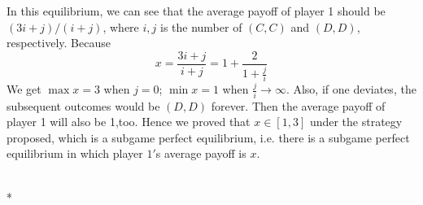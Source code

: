 \documentclass[a4paper,12pt]{article}
\begin{document}
\begin{enumerate}
\begin{enumerate}[a.]
In this equilibrium, we can see that the average payoff of player 1 should be $(3i+j)/(i+j)$,
where $i,j$ is the number of $(C,C)$ and $(D,D)$, respectively. Because 
\begin{displaymath}
x=\frac{3i+j}{i+j}=1+\frac{2}{1+\frac{j}{i}}
\end{displaymath}
We get $\max x=3 $ when $j=0$; $\min x=1$ when $\frac{j}{i}\rightarrow \infty$.
Also, if one deviates, the subsequent outcomes would be $(D,D)$ forever.
Then the average payoff of player 1 will also be 1,too.
Hence we proved that $x\in[1,3]$ under the strategy proposed, which is a subgame perfect equilibrium,
i.e. there is a subgame perfect equilibrium in which player $1'$s average payoff is $x$.

\end{enumerate}
\end{enumerate}

~\\*
\end{document}
